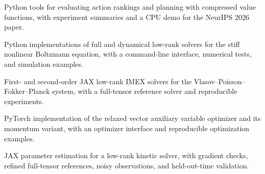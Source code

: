 Python tools for evaluating action rankings and planning with compressed value functions, with experiment summaries and a CPU demo for the NeurIPS 2026 paper.

Python implementations of full and dynamical low-rank solvers for the stiff nonlinear Boltzmann equation, with a command-line interface, numerical tests, and simulation examples.

First- and second-order JAX low-rank IMEX solvers for the Vlasov--Poisson--Fokker--Planck system, with a full-tensor reference solver and reproducible experiments.

PyTorch implementation of the relaxed vector auxiliary variable optimizer and its momentum variant, with an optimizer interface and reproducible optimization examples.

JAX parameter estimation for a low-rank kinetic solver, with gradient checks, refined full-tensor references, noisy observations, and held-out-time validation.
